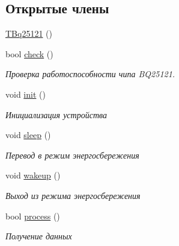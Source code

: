 \subsection*{Открытые члены}
\begin{DoxyCompactItemize}
\item 
\hyperlink{classunit_1_1_t_bq25121_ae620c44c80792004e5ed25182964d419}{T\+Bq25121} ()
\item 
\mbox{\label{classunit_1_1_t_bq25121_a0971e07af4532b7cc33517cb72d1279b}} 
bool \hyperlink{classunit_1_1_t_bq25121_a0971e07af4532b7cc33517cb72d1279b}{check} ()
\begin{DoxyCompactList}\small\item\em Проверка работоспособности чипа B\+Q25121. \end{DoxyCompactList}\item 
void \hyperlink{classunit_1_1_t_bq25121_a195490b2493631c50f5f7380436c24be}{init} ()
\begin{DoxyCompactList}\small\item\em Инициализация устройства \end{DoxyCompactList}\item 
\mbox{\label{classunit_1_1_t_bq25121_a769c16732c917f24c1b36292f13df415}} 
void \hyperlink{classunit_1_1_t_bq25121_a769c16732c917f24c1b36292f13df415}{sleep} ()
\begin{DoxyCompactList}\small\item\em Перевод в режим энергосбережения \end{DoxyCompactList}\item 
\mbox{\label{classunit_1_1_t_bq25121_a37ee8c808bce005ac349c0ea4ee9cf32}} 
void \hyperlink{classunit_1_1_t_bq25121_a37ee8c808bce005ac349c0ea4ee9cf32}{wakeup} ()
\begin{DoxyCompactList}\small\item\em Выход из режима энергосбережения \end{DoxyCompactList}\item 
\mbox{\label{classunit_1_1_t_bq25121_aef9b6fa9ec1e989523fa1584cb604a7d}} 
bool \hyperlink{classunit_1_1_t_bq25121_aef9b6fa9ec1e989523fa1584cb604a7d}{process} ()
\begin{DoxyCompactList}\small\item\em Получение данных \end{DoxyCompactList}\end{DoxyCompactItemize}


